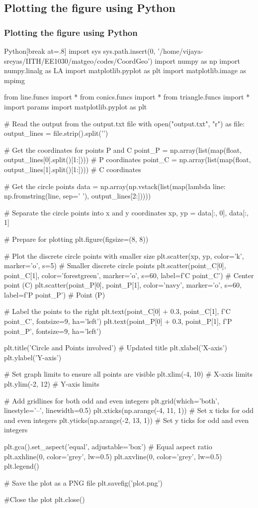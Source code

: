 \documentclass{beamer}
\theoremstyle{remark}
\numberwithin{equation}{section}
\begin{document}
\subsection{Plotting the figure using Python}
\begin{frame}
\frametitle{Plotting the figure using Python}
   \begin{mintedbox}{Python}[break at=.8\textheight]
import sys                                  
sys.path.insert(0, '/home/vijaya-sreyas/IITH/EE1030/matgeo/codes/CoordGeo')
import numpy as np
import numpy.linalg as LA
import matplotlib.pyplot as plt
import matplotlib.image as mpimg

from line.funcs import *
from conics.funcs import *
from triangle.funcs import *
import params
import matplotlib.pyplot as plt

# Read the output from the output.txt file
with open("output.txt", "r") as file:
    output_lines = file.strip().split('\n')

# Get the coordinates for points P and C
point_P = np.array(list(map(float, output_lines[0].split()[1:])))  # P coordinates
point_C = np.array(list(map(float, output_lines[1].split()[1:])))  # C coordinates

# Get the circle points
data = np.array(np.vstack(list(map(lambda line: np.fromstring(line, sep=' '), output_lines[2:]))))

# Separate the circle points into x and y coordinates
xp, yp = data[:, 0], data[:, 1]

# Prepare for plotting
plt.figure(figsize=(8, 8))

# Plot the discrete circle points with smaller size
plt.scatter(xp, yp, color='k', marker='o', s=5)  # Smaller discrete circle points
plt.scatter(point_C[0], point_C[1], color='forestgreen', marker='o', s=60, label=f'C {point_C}')  # Center point (C)
plt.scatter(point_P[0], point_P[1], color='navy', marker='o', s=60, label=f'P {point_P}')  # Point (P)

# Label the points to the right
plt.text(point_C[0] + 0.3, point_C[1], f'C {point_C}', fontsize=9, ha='left')
plt.text(point_P[0] + 0.3, point_P[1], f'P {point_P}', fontsize=9, ha='left')

plt.title('Circle and Points involved')  # Updated title
plt.xlabel('X-axis')
plt.ylabel('Y-axis')

# Set graph limits to ensure all points are visible
plt.xlim(-4, 10)  # X-axis limits
plt.ylim(-2, 12)  # Y-axis limits

# Add gridlines for both odd and even integers
plt.grid(which='both', linestyle='--', linewidth=0.5)
plt.xticks(np.arange(-4, 11, 1))  # Set x ticks for odd and even integers
plt.yticks(np.arange(-2, 13, 1))  # Set y ticks for odd and even integers

plt.gca().set_aspect('equal', adjustable='box')  # Equal aspect ratio
plt.axhline(0, color='grey', lw=0.5)
plt.axvline(0, color='grey', lw=0.5)
plt.legend()

# Save the plot as a PNG file
plt.savefig('plot.png')

#Close the plot
plt.close()
\end{mintedbox}
\end{frame}
\end{document}
